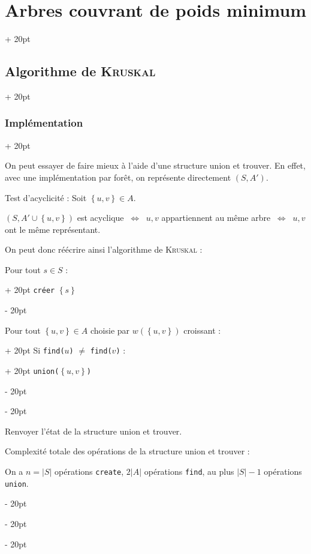 \documentclass[a4paper, 12pt, twoside]{article}
\newcommand{\set}[1]{\left\{ #1 \right\}}
\newcommand{\abs}[1]{\left\lvert #1 \right\rvert}
\newcommand{\ssi}{\ \Leftrightarrow \ }
\newcommand{\ind}[1][20pt]{\advance\leftskip + #1}
\newcommand{\deind}[1][20pt]{\advance\leftskip - #1}
\newenvironment{indt}[2][20pt]{#2 \par \ind[#1]}{\par \deind} %
\begin{document}
\begin{indt}{\section{Arbres couvrant de poids minimum}}
\begin{indt}{\subsection{Algorithme de \textsc{Kruskal}}}
\begin{indt}{\subsubsection{Implémentation}}
                \vspace{12pt}
                
                On peut essayer de faire mieux à l'aide d'une structure union et trouver.
                En effet, avec une implémentation par forêt, on représente directement $(S, A')$.

                Test d'acyclicité : Soit $\set{u, v} \in A$.

                $(S, A' \cup \set{u, v})$ est acyclique $\ssi$ $u, v$ appartiennent au même arbre $\ssi$ $u, v$ ont le même représentant.

                \vspace{6pt}
                
                On peut donc réécrire ainsi l'algorithme de \textsc{Kruskal} :

                \begin{pseudocode}
                    \begin{indt}{Pour tout $s \in S$ :}
                        \texttt{créer} $\set s$
                    \end{indt}

                    \vspace{6pt}
                    
                    \begin{indt}{Pour tout $\set{u, v} \in A$ choisie par $w(\set{u, v})$ croissant :}
                        \begin{indt}{Si \texttt{find($u$)} $\neq$ \texttt{find($v$)} :}
                            \texttt{union($\set{u ,v}$)}
                        \end{indt}
                    \end{indt}

                    \vspace{6pt}
                    
                    Renvoyer l'état de la structure union et trouver.
                \end{pseudocode}

                \vspace{12pt}
                
                Complexité totale des opérations de la structure union et trouver :

                On a $n = \abs S$ opérations \texttt{create},
                $2 \abs A$ opérations \texttt{find},
                au plus $\abs S - 1$ opérations \texttt{union}.


\end{indt}
\end{indt}
\end{indt}
\end{document}
